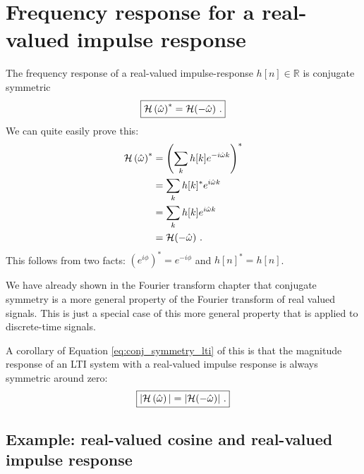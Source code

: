     \section{Frequency response for a real-valued impulse response}

    The frequency response of a real-valued impulse-response
    $h[n]\in \mathbb{R}$ is conjugate symmetric
    \begin{equation}
        \boxed{
            \mathcal{H}\left(\hat{\omega}\right)^* = \mathcal{H}(-\hat{\omega})\,\,.
        }
        \label{eq:conj_symmetry_lti}
    \end{equation}
    We can quite easily prove this:
    \begin{align}
        \mathcal{H}\left(\hat{\omega}\right)^* & = \left(\sum_k h[k] e^{-i\hat{\omega}k}\right)^* \\
              & = \sum_k h[k]^* e^{i\hat{\omega}k}               \\
              & = \sum_k h[k] e^{i\hat{\omega}k}                 \\
              & = \mathcal{H}(-\hat{\omega})\,\,.
    \end{align}
    This follows from two facts: $(e^{i\phi})^* = e^{-i\phi}$ and $h[n]^*
        = h[n]$.

    We have already shown in the Fourier transform chapter that conjugate
    symmetry is a more general property of the Fourier transform of real
    valued signals. This is just a special case of this more general
    property that is applied to discrete-time signals.

    A corollary of Equation \ref{eq:conj_symmetry_lti} of this is that the
    magnitude response of an LTI system with a real-valued impulse
    response is always symmetric around zero:
    \begin{equation}
        \boxed{
            |\mathcal{H}\left(\hat{\omega}\right)| = |\mathcal{H}(-\hat{\omega})|\,\,.
        }
    \end{equation}

    \subsection{Example: real-valued cosine and real-valued impulse response}

